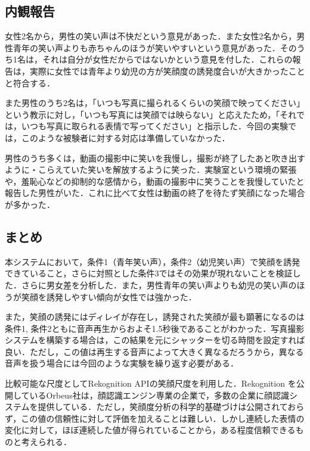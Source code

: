 \documentclass[submit,techreq]{ec2014}
\begin{document}
\subsection{内観報告}

女性2名から，男性の笑い声は不快だという意見があった．また女性2名から，男性青年の笑い声よりも赤ちゃんのほうが笑いやすいという意見があった．そのうち1名は，それは自分が女性だからではないかという意見を付した．これらの報告は，実際に女性では青年より幼児の方が笑顔度の誘発度合いが大きかったことと符合する．

また男性のうち2名は，「いつも写真に撮られるくらいの笑顔で映ってください」という教示に対し，「いつも写真には笑顔では映らない」と応えたため，「それでは，いつも写真に取られる表情で写ってください」と指示した．今回の実験では，このような被験者に対する対応は準備していなかった．

男性のうち多くは，動画の撮影中に笑いを我慢し，撮影が終了したあと吹き出すように・こらえていた笑いを解放するように笑った．実験室という環境の緊張や，羞恥心などの抑制的な感情から，動画の撮影中に笑うことを我慢していたと報告した男性がいた．これに比べて女性は動画の終了を待たず笑顔になった場合が多かった．

\subsection{まとめ}

本システムにおいて，条件1（青年笑い声），条件2（幼児笑い声）で笑顔を誘発できていること，さらに対照とした条件3ではその効果が現れないことを検証した．さらに男女差を分析した．また，男性青年の笑い声よりも幼児の笑い声のほうが笑顔を誘発しやすい傾向が女性では強かった．

また，笑顔の誘発にはディレイが存在し，誘発された笑顔が最も顕著になるのは条件1, 条件2ともに音声再生からおよそ1.5秒後であることがわかった．写真撮影システムを構築する場合は，この結果を元にシャッターを切る時間を設定すれば良い．ただし，この値は再生する音声によって大きく異なるだろうから，異なる音声を扱う場合には今回のような実験を繰り返す必要がある．

比較可能な尺度としてRekognition APIの笑顔尺度を利用した．Rekognition を公開しているOrbeus社は，顔認識エンジン専業の企業で，多数の企業に顔認識システムを提供している．ただし，笑顔度分析の科学的基礎づけは公開されておらず，この値の信頼性に対して評価を加えることは難しい．しかし連続した表情の変化に対して，ほぼ連続した値が得られていることから，ある程度信頼できるものと考えられる．
\end{document}
